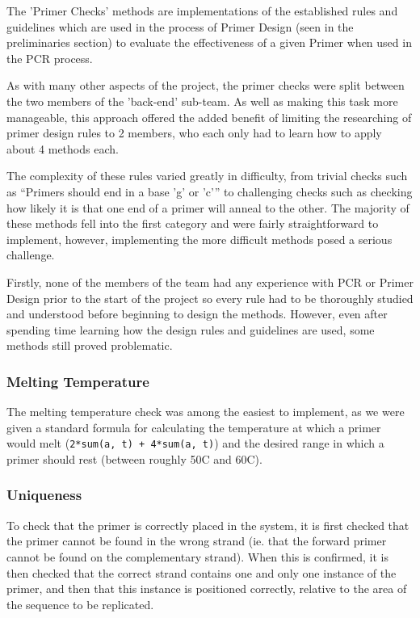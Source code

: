 The 'Primer Checks' methods are implementations of the established rules
and guidelines which are used in the process of Primer Design (seen in
the preliminaries section) to evaluate the effectiveness of a given 
Primer when used in the PCR process.

As with many other aspects of the project, the primer checks were split
between the two members of the 'back-end' sub-team. As well as making
this task more manageable, this approach offered the added benefit of
limiting the researching of primer design rules to 2 members, who each
only had to learn how to apply about 4 methods each.

The complexity of these rules varied greatly in difficulty, from
trivial checks such as “Primers should end in a base 'g' or 'c'” to
challenging checks such as checking how likely it is that one end of a
primer  will anneal to the other. The majority of these methods fell
into the first category and were fairly straightforward to implement,
however,  implementing the more difficult methods posed a serious
challenge.

Firstly, none of the members of the team had any experience with PCR or
Primer Design prior to the start of the project so every rule had to be
thoroughly studied and understood before beginning to design the
methods. However, even after spending time learning how the design
rules and guidelines are used, some methods still proved problematic.

\subsubsection{Melting Temperature}
The melting temperature check was among the easiest to implement, as we
were given a standard formula for calculating the temperature at which a 
primer would melt (\texttt{2*sum(a, t) + 4*sum(a, t)}) and the desired 
range in which a primer should rest (between roughly 50\degree C and 
60\degree C).

\subsubsection{Uniqueness}
To check that the primer is correctly placed in the system, it is first checked
that the primer cannot be found in the wrong strand (ie. that the forward
primer cannot be found on the complementary strand). When this is confirmed,
it is then checked that the correct strand contains one and only one instance
of the primer, and then that this instance is positioned correctly, relative
to the area of the sequence to be replicated.


